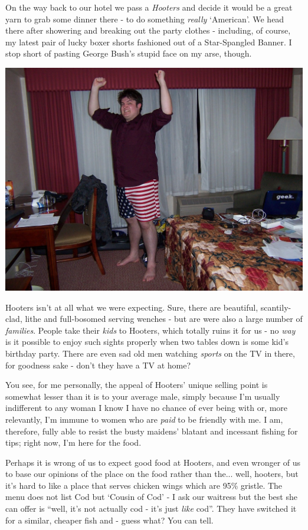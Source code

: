 \documentclass[a5paper,titlepage,11pt]{book}
\begin{document}
On the way back to our hotel we pass a \emph{Hooters} and decide it would be a great yarn to grab some dinner there - to do something \emph{really} `American'. We head there after showering and breaking out the party clothes - including, of course, my latest pair of lucky boxer shorts fashioned out of a Star-Spangled Banner. I stop short of pasting George Bush's stupid face on my arse, though.

\begin{center}\includegraphics[width=\textwidth]{gfx/100_1097}\end{center}

Hooters isn't at all what we were expecting. Sure, there are beautiful, scantily-clad, lithe and full-bosomed serving wenches - but are were also a large number of \emph{families}. People take their \emph{kids} to Hooters, which totally ruins it for us - no \emph{way} is it possible to enjoy such sights properly when two tables down is some kid's birthday party. There are even sad old men watching \emph{sports} on the TV in there, for goodness sake - don't they have a TV at home?

You see, for me personally, the appeal of Hooters' unique selling point is somewhat lesser than it is to your average male, simply because I'm usually indifferent to any woman I know I have no chance of ever being with or, more relevantly, I'm immune to women who are \emph{paid} to be friendly with me. I am, therefore, fully able to resist the busty maidens' blatant and incessant fishing for tips; right now, I'm here for the food.

Perhaps it is wrong of us to expect good food at Hooters, and even wronger of us to base our opinions of the place on the food rather than the... well, hooters, but it's hard to like a place that serves chicken wings which are 95\% gristle. The menu does not list Cod but `Cousin of Cod' - I ask our waitress but the best she can offer is ``well, it's not actually cod - it's just \emph{like} cod''. They have switched it for a similar, cheaper fish and - guess what?  You can tell.
\end{document}
